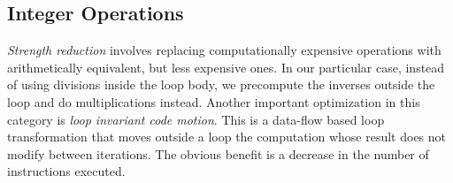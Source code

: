 \subsection{Integer Operations}

\textit{Strength reduction} involves replacing computationally expensive
operations with arithmetically equivalent, but less expensive ones. In our
particular case, instead of using divisions inside the loop body, we precompute
the inverses outside the loop and do multiplications instead. Another important
optimization in this category is \textit{loop invariant code motion}. This is a
data-flow based loop transformation that moves outside a loop the computation
whose result does not modify between iterations. The obvious benefit is a
decrease in the number of instructions executed.